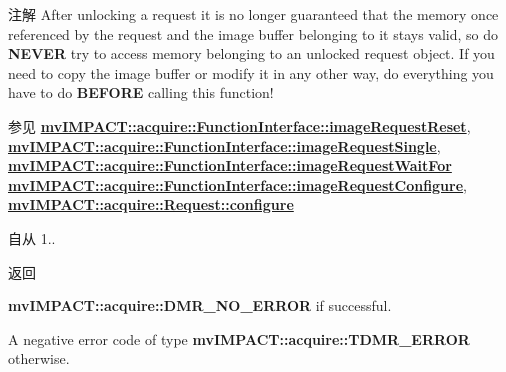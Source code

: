 \begin{DoxyNote}{注解}
After unlocking a request it is no longer guaranteed that the memory once referenced by the request and the image buffer belonging to it stays valid, so do {\bfseries N\+E\+V\+E\+R} try to access memory belonging to an unlocked request object. If you need to copy the image buffer or modify it in any other way, do everything you have to do {\bfseries B\+E\+F\+O\+R\+E} calling this function!
\end{DoxyNote}
\begin{DoxySeeAlso}{参见}
{\bfseries \hyperlink{classmv_i_m_p_a_c_t_1_1acquire_1_1_function_interface_a234b2c6e31f3e83629501da47095c54f}{mv\+I\+M\+P\+A\+C\+T\+::acquire\+::\+Function\+Interface\+::image\+Request\+Reset}}, ~\newline
{\bfseries \hyperlink{classmv_i_m_p_a_c_t_1_1acquire_1_1_function_interface_a59571120b5e81c3af596ea5da5dc63ba}{mv\+I\+M\+P\+A\+C\+T\+::acquire\+::\+Function\+Interface\+::image\+Request\+Single}}, ~\newline
{\bfseries \hyperlink{classmv_i_m_p_a_c_t_1_1acquire_1_1_function_interface_a4cefdfda8e8940736ae9a4c97b6de8c9}{mv\+I\+M\+P\+A\+C\+T\+::acquire\+::\+Function\+Interface\+::image\+Request\+Wait\+For}} ~\newline
{\bfseries \hyperlink{classmv_i_m_p_a_c_t_1_1acquire_1_1_function_interface_a05594ac5b54679152d27ac0e73b3908e}{mv\+I\+M\+P\+A\+C\+T\+::acquire\+::\+Function\+Interface\+::image\+Request\+Configure}}, ~\newline
{\bfseries \hyperlink{classmv_i_m_p_a_c_t_1_1acquire_1_1_request_a5ad02aed16acd60699f3d8757c63af43}{mv\+I\+M\+P\+A\+C\+T\+::acquire\+::\+Request\+::configure}} 
\end{DoxySeeAlso}
\begin{DoxySince}{自从}
1..
\end{DoxySince}
\begin{DoxyReturn}{返回}

\begin{DoxyItemize}
\item {\bfseries mv\+I\+M\+P\+A\+C\+T\+::acquire\+::\+D\+M\+R\+\_\+\+N\+O\+\_\+\+E\+R\+R\+O\+R} if successful.
\item A negative error code of type {\bfseries mv\+I\+M\+P\+A\+C\+T\+::acquire\+::\+T\+D\+M\+R\+\_\+\+E\+R\+R\+O\+R} otherwise. 
\end{DoxyItemize}
\end{DoxyReturn}


